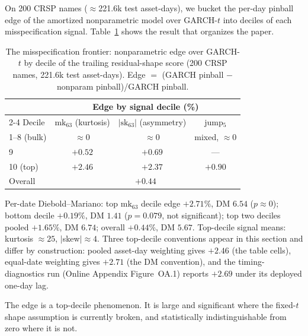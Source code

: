 \documentclass[11pt]{article}
\theoremstyle{remark}
\begin{document}
On 200 CRSP names ($\approx$221.6k test asset-days), we bucket the per-day
pinball edge of the amortized nonparametric model over GARCH-$t$ into
deciles of each misspecification signal.
Table~\ref{tab:frontier} shows the result that organizes the paper.

\begin{table}[t]
\centering
\begin{threeparttable}
\caption{The misspecification frontier: nonparametric edge over
GARCH-$t$ by decile of the trailing residual-shape score (200 CRSP
names, 221.6k test asset-days). Edge $=$ (GARCH pinball $-$ nonparam
pinball)/GARCH pinball.}
\label{tab:frontier}
\begin{tabular}{lccc}
\toprule
& \multicolumn{3}{c}{Edge by signal decile (\%)} \\
\cmidrule(lr){2-4}
Decile & $\mathrm{mk}_{63}$ (kurtosis) & $|\mathrm{sk}_{63}|$ (asymmetry) & jump$_5$ \\
\midrule
1--8 (bulk) & $\approx 0$ & $\approx 0$ & mixed, $\approx 0$ \\
9 & $+0.52$ & $+0.69$ & --- \\
10 (top) & $\mathbf{+2.46}$ & $\mathbf{+2.37}$ & $+0.90$ \\
\midrule
Overall & \multicolumn{3}{c}{$+0.44$} \\
\bottomrule
\end{tabular}
\begin{tablenotes}\footnotesize
\item Per-date Diebold--Mariano: top $\mathrm{mk}_{63}$ decile edge
$+2.71\%$, DM $6.54$ ($p \approx 0$); bottom decile $+0.19\%$, DM $1.41$
($p = 0.079$, not significant); top two deciles pooled $+1.65\%$, DM
$6.74$; overall $+0.44\%$, DM $5.67$. Top-decile signal means: kurtosis
$\approx 25$, $|$skew$| \approx 4$. Three top-decile conventions
appear in this section and differ by construction: pooled asset-day
weighting gives $+2.46$ (the table cells), equal-date weighting gives
$+2.71$ (the DM convention), and the timing-diagnostics run
(Online Appendix Figure~OA.1) reports $+2.69$ under its deployed
one-day lag.
\end{tablenotes}
\end{threeparttable}
\end{table}

The edge is a top-decile phenomenon. It is large and significant
where the fixed-$t$ shape assumption is currently broken, and
statistically indistinguishable from zero where it is not.
\end{document}
